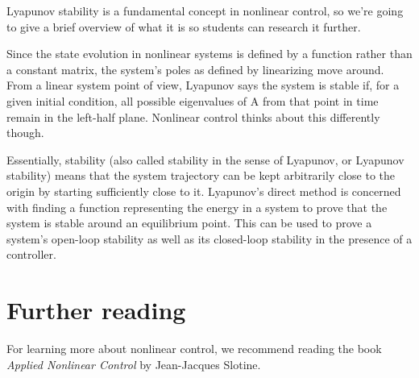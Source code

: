 Lyapunov stability is a fundamental concept in nonlinear control, so we're going
to give a brief overview of what it is so students can research it further.

Since the state evolution in nonlinear systems is defined by a function rather
than a constant matrix, the system's poles as defined by linearizing move
around. From a linear system point of view, Lyapunov says the system is stable
if, for a given initial condition, all possible eigenvalues of A from that point
in time remain in the left-half plane. Nonlinear control thinks about this
differently though.

Essentially, stability (also called stability in the sense of Lyapunov, or
Lyapunov stability) means that the system trajectory can be kept arbitrarily
close to the origin by starting sufficiently close to it. Lyapunov's direct
method is concerned with finding a function representing the energy in a system
to prove that the system is stable around an equilibrium point. This can be used
to prove a system's open-loop stability as well as its closed-loop stability in
the presence of a controller.

\section{Further reading}

For learning more about nonlinear control, we recommend reading the book
\textit{Applied Nonlinear Control} by Jean-Jacques Slotine.
